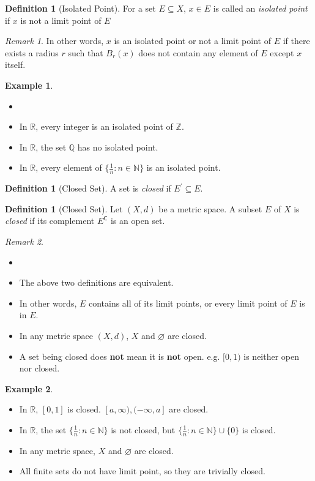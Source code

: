 \documentclass[12pt, lettersize]{article}
\theoremstyle{plain}
\theoremstyle{definition}
\newtheorem{dfn}[thm]{Definition}
\newtheorem*{eg}{Example}
\theoremstyle{remark}
\newtheorem*{rem}{Remark}
\newcommand{\R}{\mathbb{R}}
\newcommand{\N}{\mathbb{N}}
\newcommand{\Q}{\mathbb{Q}}
\newcommand{\com}{\mathsf{C}}
\let\emptyset\varnothing
\begin{document}
\begin{dfn}[Isolated Point]
	For a set $E\subseteq X$, $x\in E$ is called an \emph{isolated point} if $x$ is not a limit point of $E$
\end{dfn}
\begin{rem}
	In other words, $x$ is an isolated point or not a limit point of $E$ if there exists a radius $r$ such that $B_r(x)$ does not contain any element of $E$ except $x$ itself.
\end{rem}
\begin{eg}
	\begin{itemize}
		\item[]
		\item In $\R$, every integer is an isolated point of $\mathbb{Z}$.
		\item In $\R$, the set $\Q$ has no isolated point.
		\item In $\R$, every element of $\{\frac{1}{n}: n\in\N\}$ is an isolated point. 
	\end{itemize}
\end{eg}

\begin{dfn}[Closed Set]
	A set is \emph{closed} if $E^\prime\subseteq E$.
\end{dfn}
\begin{dfn}[Closed Set]
	Let $(X,d)$ be a metric space. A subset $E$ of $X$ is \emph{closed} if its complement $E^\com$ is an open set.
\end{dfn}
\begin{rem}
	\begin{itemize}
		\item[]
		\item The above two definitions are equivalent.
		\item In other words, $E$ contains all of its limit points, or every limit point of $E$ is in $E$.
		\item In any metric space $(X,d)$, $X$ and $\emptyset$ are closed.
		\item A set being closed does \textbf{not} mean it is \textbf{not} open. e.g. $[0,1)$ is neither open nor closed.
	\end{itemize}
\end{rem}
\begin{eg}
	\begin{itemize}
		\item In $\R$, $[0,1]$ is closed. $[a,\infty),(-\infty,a]$ are closed.
		\item In $\R$, the set $\{\frac{1}{n}: n\in\N\}$ is not closed, but $\{\frac{1}{n}: n\in\N\}\cup\{0\}$ is closed.
		\item In any metric space, $X$ and $\emptyset$ are closed.
		\item All finite sets do not have limit point, so they are trivially closed.
	\end{itemize}
\end{eg}
\end{document}

